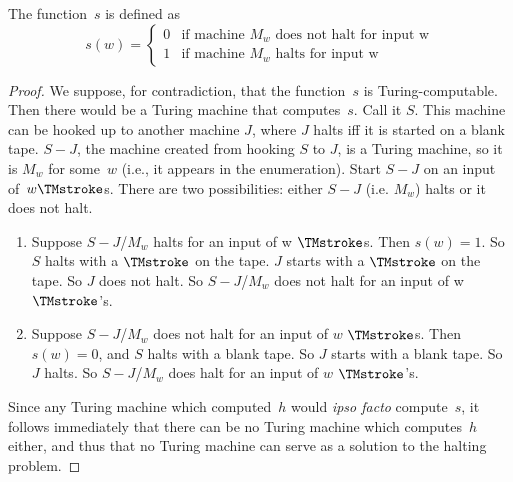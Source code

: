 \documentclass[../../../include/open-logic-section]{subfiles}
\begin{document}
\begin{defn} The function~$s$ is defined as
\[
s(w) =
\begin{cases}
  \text{0} & \text{if machine~$M_w$ does not halt for input w} \\
  \text{1} & \text{if machine~$M_w$ halts for input w}
\end{cases}
\]
\end{defn}

\begin{proof}
We suppose, for contradiction, that the function~$s$ is Turing-computable.
Then there would be a Turing machine that computes~$s$. Call it $S$. This
machine can be hooked up to another machine $J$, where $J$ halts iff it is
started on a blank tape. $S-J$, the machine created from hooking $S$ to
$J$, is a
Turing machine, so it is $M_w$ for some~$w$ (i.e., it appears in the
enumeration). Start $S-J$ on an input of~$w \TMstroke$s. There are two
possibilities: either $S-J$ (i.e. $M_w$) halts or it does not halt.
\begin{enumerate}
\item Suppose $S-J$/$M_w$ halts for an input of w $\TMstroke$s. Then
  $s(w) = 1$. So $S$ halts with a $\TMstroke$ on the tape.  $J$ starts
  with a $\TMstroke$ on the tape. So $J$ does not halt. So $S-J$/$M_w$
  does not halt for an input of w $\TMstroke$'s.

\item Suppose $S-J$/$M_w$ does not halt for an input of $w$
  $\TMstroke$s.  Then $s(w) = 0$, and $S$ halts with a blank tape. So
  $J$ starts with a blank tape.  So $J$ halts. So $S-J$/$M_w$ does
  halt for an input of $w$ $\TMstroke$'s.
\end{enumerate}

Since any Turing machine which computed~$h$ would \emph{ipso facto}
compute~$s$, it follows immediately that there can be no Turing machine
which computes~$h$ either, and thus that no Turing machine can serve as a
solution to the halting problem.
\end{proof}
\end{document}
